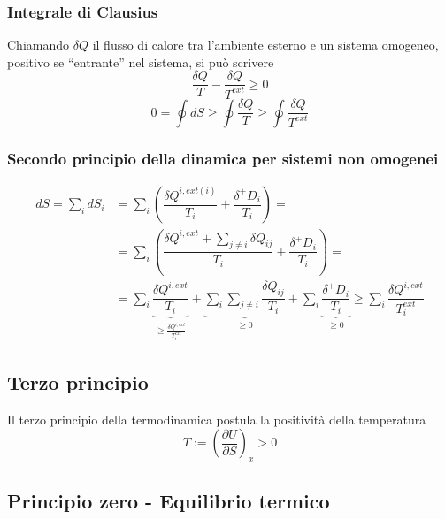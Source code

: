 \subsubsection{Integrale di Clausius}
Chiamando $\delta Q$ il flusso di calore tra l'ambiente esterno e un sistema omogeneo, positivo se ``entrante'' nel sistema,
si può scrivere
\begin{equation}
    \dfrac{\delta Q}{T} - \dfrac{\delta Q}{T^{ext}} \ge 0
\end{equation}
\begin{equation}
    0 = \oint dS \ge \oint \dfrac{\delta Q}{T} \ge \oint \dfrac{\delta Q}{T^{ext}} 
\end{equation}

\subsubsection{Secondo principio della dinamica per sistemi non omogenei}

\begin{equation}
\begin{aligned}
    dS = \sum_i dS_i
    & = \sum_i \left( \dfrac{\delta Q^{i,ext(i)}}{T_i} + \dfrac{\delta^+ D_i}{T_i} \right) = \\
    & = \sum_i \left( \dfrac{\delta Q^{i,ext} + \sum_{j \ne i} \delta Q_{ij}}{T_i} + \dfrac{\delta^+ D_i}{T_i} \right) = \\
    & = \sum_i \underbrace{ \dfrac{\delta Q^{i,ext}}{T_i} }_{\ge \frac{\delta Q^{i,ext}}{T_i^{ext}}} +  \underbrace{ \sum_i \sum_{j \ne i} \dfrac{\delta Q_{ij}}{T_i} }_{\ge 0} + \sum_i \underbrace{ \dfrac{\delta^+ D_i}{T_i}}_{\ge 0} \ge \sum_i \dfrac{\delta Q^{i,ext}}{T_i^{ext}}
\end{aligned}
\end{equation}


\subsection{Terzo principio}
Il terzo principio della termodinamica postula la positività della temperatura
\begin{equation}
  T := \left(\dfrac{\partial U}{\partial S}\right)_x > 0
\end{equation}

\subsection{Principio zero - Equilibrio termico}

